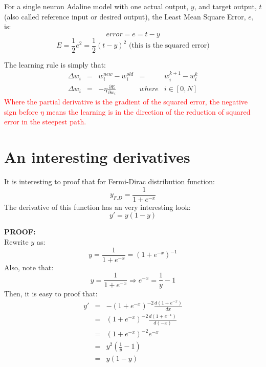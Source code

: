\begin{definition}
For a single neuron Adaline model with one actual output, $y$, and target output, $t$ (also called reference input or desired output), the Least Mean Square Error, $e$, is:
\[error = e = t-y\]
\[E = \frac{1}{2}e^2 =\frac{1}{2} (t-y)^2 \text{    (this is the squared error)}\]
\end{definition}
The learning rule is simply that:
\[\begin{array}{*{20}{c}}
{\Delta {w_i}}& = &{w_i^{new} - w_i^{old}}& = &{w_i^{k + 1} - w_i^k}\\
{\Delta {w_i}}& = &{ - \eta \frac{{\partial E}}{{\partial {w_i}}}}&{where}&{i \in \left[ {0,N} \right]}
\end{array}\]
\textcolor{red}{Where the partial derivative is the gradient of the squared error, the negative sign before $\eta$ means the learning is in the direction of the reduction of squared error in the steepest path.}

\noindent{\color{red} \rule{\linewidth}{0.5mm}}

\section{An interesting derivatives}
It is interesting to proof that for Fermi-Dirac distribution function:
\[y_{F.D} = \frac{1}{{1 + {e^{ - x}}}}\]
The derivative of this function has an very interesting look: 
\[y' = y\left( {1 - y} \right)\]

\noindent{\color{black} \rule{\linewidth}{0.5mm}}
\textbf{PROOF:}
\pushQED{\qed} 
\\
Rewrite $y$ as: 
\[y = \frac{1}{{1 + {e^{ - x}}}} = {\left( {1 + {e^{ - x}}} \right)^{ - 1}}\]
Also, note that:
\[y = \frac{1}{{1 + {e^{ - x}}}} \Rightarrow {e^{ - x}} = \frac{1}{y} - 1\]
Then, it is easy to proof that:
\[\begin{array}{*{20}{c}}
{y'}& = &{ - {{\left( {1 + {e^{ - x}}} \right)}^{ - 2}}\frac{{d\left( {1 + {e^{ - x}}} \right)}}{{dx}}}\\
{}& = &{{{\left( {1 + {e^{ - x}}} \right)}^{ - 2}}\frac{{d\left( {1 + {e^{ - x}}} \right)}}{{d\left( { - x} \right)}}}\\
{}& = &{{{\left( {1 + {e^{ - x}}} \right)}^{ - 2}}{e^{ - x}}}\\
{}& = &{{y^2}\left( {\frac{1}{y} - 1} \right)}\\
{}& = &{y\left( {1 - y} \right)}
\end{array}\]\qedhere

